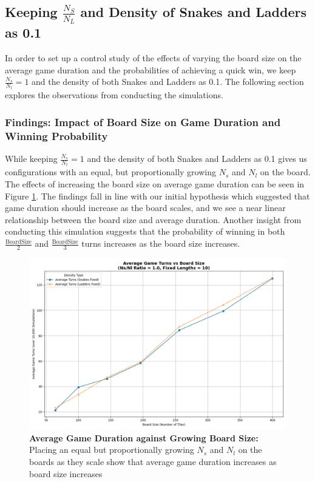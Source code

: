 \subsection{Keeping $\frac{N_S}{N_L}$ and Density of Snakes and Ladders as 0.1}

In order to set up a control study of the effects of varying the board size on the average game duration and the probabilities of achieving a quick win, we keep $\frac{N_s}{N_l} = 1$ and the density of both Snakes and Ladders as 0.1. The following section explores the observations from conducting the simulations.

\subsubsection{Findings: Impact of Board Size on Game Duration and Winning Probability}

While keeping $\frac{N_s}{N_l} = 1$ and the density of both Snakes and Ladders as 0.1 gives us configurations with an equal, but proportionally growing $N_s$ and $N_l$ on the board. The effects of increasing the board size on average game duration can be seen in Figure \ref{fig:fixedratiofixeddensity}. The findings fall in line with our initial hypothesis which suggested that game duration should increase as the board scales, and we see a near linear relationship between the board size and average duration. Another insight from conducting this simulation suggests that the probability of winning in both $\frac{\text{BoardSize}}{2}$ and $\frac{\text{BoardSize}}{3}$ turns increases as the board size increases. 

\begin{figure}[th]
	\centering
	\includegraphics[width=0.8\linewidth]{"../Chapter 4/Latest/plots_output/AvgTurnsVsBoardSize_RatioOne/AvgTurnsVsBoardSize_RatioOne_ns_nl_ratio-1_0"}
	\caption{\textbf{Average Game Duration against Growing Board Size:} Placing an equal but proportionally growing $N_s$ and $N_l$ on the boards as they scale show that average game duration increases as board size increases}
	\label{fig:fixedratiofixeddensity}
\end{figure}

